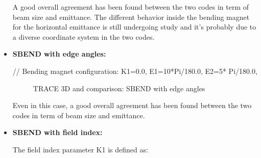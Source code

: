 \begin{itemize}
A good overall agreement has been found between the two codes in term of beam size and emittance. The different behavior inside the bending magnet for the horizontal emittance is still undergoing study and it's probably due to a diverse coordinate system in the two codes.

\item \textbf{SBEND with edge angles:}

\begin{example}
// Bending magnet configuration:
K1=0.0,
E1=10*Pi/180.0, E2=5* Pi/180.0,
\end{example}


\begin{figure}[!htb]
\begin{center}
    \hspace{1.8cm}
    \caption{TRACE 3D and \opal comparison: SBEND with edge angles}
    \label{fig:SBEND_Edges}
\end{center}
 \end{figure}

Even in this case, a good overall agreement has been found between the two codes in term of beam size and emittance.

\item \textbf{SBEND with field index:}

The field index parameter K1 is defined as:


\end{itemize}
